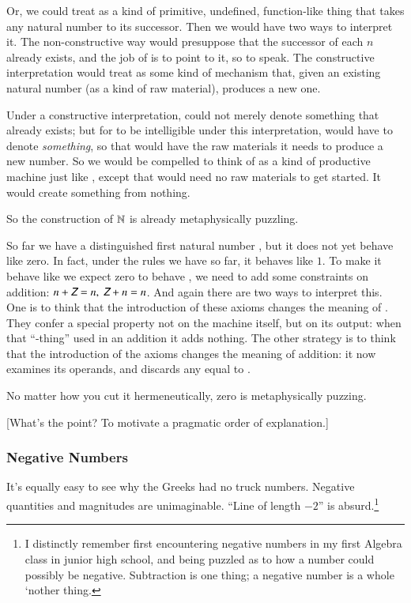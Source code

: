 \documentclass{article}
\begin{document}
Or, we could treat \SNat{} as a kind of primitive, undefined,
function-like thing that takes any natural number to its successor.
Then we would have two ways to interpret it. The non-constructive way
would presuppose that the successor of each \(n\) already exists, and
the job of \SNat{} is to point to it, so to speak. The constructive
interpretation would treat \SNat{} as some kind of mechanism that, given
an existing natural number (as a kind of raw material), produces a new
one.

Under a constructive interpretation, \ZNat{} could not merely denote
something that already exists; but for \ZS{} to be intelligible
under this interpretation, \ZNat{} would have to denote
\textit{something}, so that \SNat{} would have the raw materials it
needs to produce a new number. So we would be compelled to think of
\ZNat{} as a kind of productive machine just like \SNat, except that
\ZNat{} would need no raw materials to get started. It would create
something from nothing.

So the construction of \(\mathbb{N}\) is already metaphysically puzzling.

So far we have a distinguished first natural number \ZNat, but it does
not yet behave like zero. In fact, under the rules we have so far, it
behaves like \(1\). To make it behave like we expect zero to behave ,
we need to add some constraints on addition: \(n + \ZNat = n,\ \ZNat +
n = n\). And again there are two ways to interpret this. One is to
think that the introduction of these axioms changes the meaning of
\ZNat. They confer a special property not on the \ZNat machine itself,
but on its output: when that ``\ZNat-thing'' used in an addition it
adds nothing. The other strategy is to think that the introduction of
the axioms changes the meaning of addition: it now examines its
operands, and discards any equal to \ZNat.

No matter how you cut it hermeneutically, zero is metaphysically
puzzing.

[What's the point? To motivate a pragmatic order of explanation.]

\subsubsection{Negative Numbers}

It's equally easy to see why the Greeks had no truck numbers. Negative
quantities and magnitudes are unimaginable. ``Line of length \(-2\)''
is absurd.\footnote{I distinctly remember first encountering negative
numbers in my first Algebra class in junior high school, and being
puzzled as to how a number could possibly be negative. Subtraction is
one thing; a negative number is a whole `nother thing.}
\end{document}
